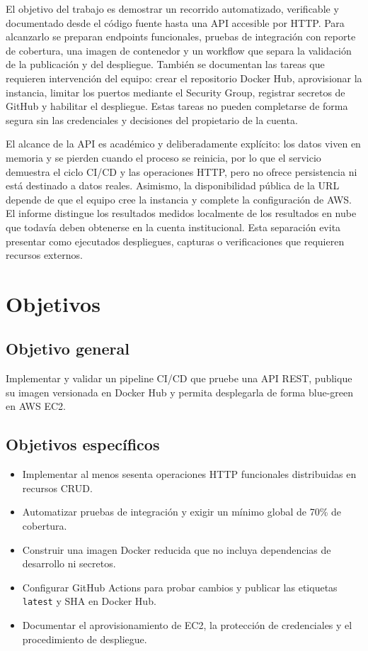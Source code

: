 \documentclass[12pt,letterpaper]{article}
\begin{document}
El objetivo del trabajo es demostrar un recorrido automatizado, verificable y documentado desde el código fuente hasta una API accesible por HTTP. Para alcanzarlo se preparan endpoints funcionales, pruebas de integración con reporte de cobertura, una imagen de contenedor y un workflow que separa la validación de la publicación y del despliegue. También se documentan las tareas que requieren intervención del equipo: crear el repositorio Docker Hub, aprovisionar la instancia, limitar los puertos mediante el Security Group, registrar secretos de GitHub y habilitar el despliegue. Estas tareas no pueden completarse de forma segura sin las credenciales y decisiones del propietario de la cuenta.

El alcance de la API es académico y deliberadamente explícito: los datos viven en memoria y se pierden cuando el proceso se reinicia, por lo que el servicio demuestra el ciclo CI/CD y las operaciones HTTP, pero no ofrece persistencia ni está destinado a datos reales. Asimismo, la disponibilidad pública de la URL depende de que el equipo cree la instancia y complete la configuración de AWS. El informe distingue los resultados medidos localmente de los resultados en nube que todavía deben obtenerse en la cuenta institucional. Esta separación evita presentar como ejecutados despliegues, capturas o verificaciones que requieren recursos externos.

\section{Objetivos}
\subsection{Objetivo general}
Implementar y validar un pipeline CI/CD que pruebe una API REST, publique su imagen versionada en Docker Hub y permita desplegarla de forma blue-green en AWS EC2.
\subsection{Objetivos específicos}
\begin{itemize}
  \item Implementar al menos sesenta operaciones HTTP funcionales distribuidas en recursos CRUD.
  \item Automatizar pruebas de integración y exigir un mínimo global de 70\% de cobertura.
  \item Construir una imagen Docker reducida que no incluya dependencias de desarrollo ni secretos.
  \item Configurar GitHub Actions para probar cambios y publicar las etiquetas \texttt{latest} y SHA en Docker Hub.
  \item Documentar el aprovisionamiento de EC2, la protección de credenciales y el procedimiento de despliegue.
\end{itemize}
\end{document}

